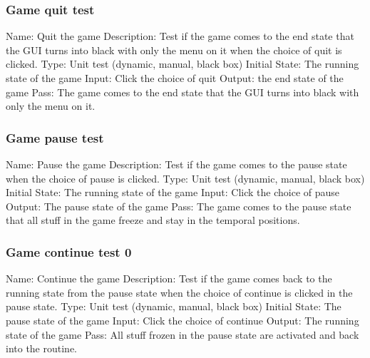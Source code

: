 \documentclass{article}
\begin{document}
\subsubsection{Game quit test}
Name:  Quit the game\newline
Description: Test if the game comes to the end state that the GUI turns into black with only the menu on it when the choice of quit is clicked. \newline
Type: Unit test (dynamic, manual, black box) \newline
Initial State:  The running state of the game \newline
Input: Click the choice of quit\newline
Output: the end state of the game  \newline
Pass: The game comes to the end state that the GUI turns into black with only the menu on it. \newline

\subsubsection{Game pause test}
Name:  Pause the game\newline
Description: Test if the game comes to the pause state when the choice of pause is clicked. \newline
Type: Unit test (dynamic, manual, black box) \newline
Initial State: The running state of the game \newline
Input: Click the choice of pause \newline
Output: The pause state of the game\newline
Pass: The game comes to the pause state that all stuff in the game freeze and stay in the temporal positions. \newline

\subsubsection{Game continue test 0}
Name:  Continue the game\newline
Description: Test if the game comes back to the running state from the pause state when the choice of continue is clicked in the pause state. \newline
Type: Unit test (dynamic, manual, black box) \newline
Initial State: The pause state of the game\newline
Input: Click the choice of continue \newline
Output: The running state of the game\newline
Pass: All stuff frozen in the pause state are activated and back into the routine. \newline
\end{document}
